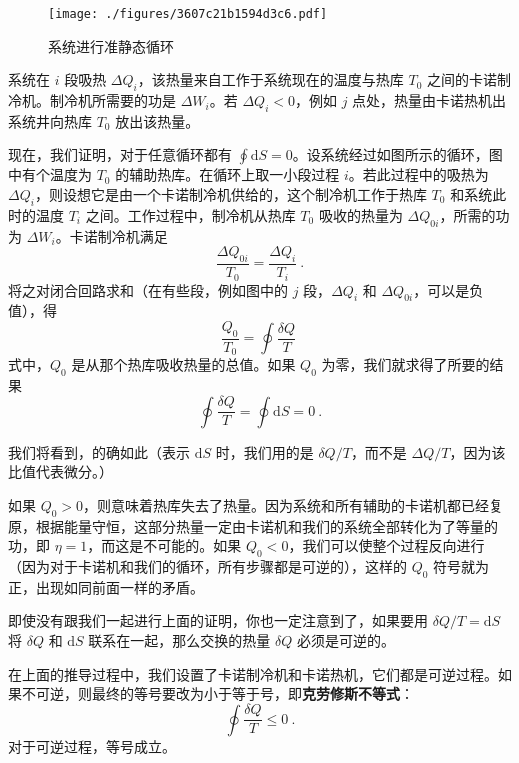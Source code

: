 \begin{figure}[ht]
\centering
\texttt{[image: ./figures/3607c21b1594d3c6.pdf]}
\caption{系统进行准静态循环} \label{fig_Entrop_1}
\end{figure}

系统在 $i$ 段吸热 $\Delta Q_i$，该热量来自工作于系统现在的温度与热库 $T_0$ 之间的卡诺制冷机。制冷机所需要的功是 $\Delta W_i$。若 $\Delta Q_i<0$，例如 $j$ 点处，热量由卡诺热机出系统井向热库 $T_0$ 放出该热量。

现在，我们证明，对于任意循环都有 $\oint \mathrm d S =0 $。设系统经过如图所示的循环，图中有个温度为 $T_0$ 的辅助热库。在循环上取一小段过程 $i$。若此过程中的吸热为 $\Delta Q_i$，则设想它是由一个卡诺制冷机供给的，这个制冷机工作于热库 $T_0$ 和系统此时的温度 $T_i$ 之间。工作过程中，制冷机从热库 $T_0$ 吸收的热量为 $\Delta Q_{0i}$，所需的功为 $\Delta W_i$。卡诺制冷机满足
\begin{equation}
\frac{\Delta Q_{0i}}{T_0}=\frac{\Delta Q_i}{T_i}~.
\end{equation}
将之对闭合回路求和（在有些段，例如图中的 $j$ 段，$\Delta Q_i$ 和 $\Delta Q_{0i}$，可以是负值），得
\begin{equation}
\frac{Q_0}{T_0}=\oint{\frac{\delta Q}{T}}~
\end{equation}
式中，$Q_0$ 是从那个热库吸收热量的总值。如果 $Q_0$ 为零，我们就求得了所要的结果
\begin{equation}
\oint{\frac{\delta Q}{T}=\oint{\text{d}S=0}}~.
\end{equation}

我们将看到，的确如此（表示 $\mathrm dS $ 时，我们用的是 $\delta Q/T$，而不是 $\Delta Q/T$，因为该比值代表微分。）

如果 $Q_0>0$，则意味着热库失去了热量。因为系统和所有辅助的卡诺机都已经复原，根据能量守恒，这部分热量一定由卡诺机和我们的系统全部转化为了等量的功，即 $\eta=1$，而这是不可能的。如果 $Q_0<0$，我们可以使整个过程反向进行（因为对于卡诺机和我们的循环，所有步骤都是可逆的），这样的 $Q_0$ 符号就为正，出现如同前面一样的矛盾。

即使没有跟我们一起进行上面的证明，你也一定注意到了，如果要用 $\delta Q/T=\mathrm d S$ 将 $\delta Q$ 和 $\mathrm dS$ 联系在一起，那么交换的热量 $\delta Q$ 必须是可逆的。

在上面的推导过程中，我们设置了卡诺制冷机和卡诺热机，它们都是可逆过程。如果不可逆，则最终的等号要改为小于等于号，即\textbf{克劳修斯不等式}：
\begin{equation}
\oint \frac{\delta Q}{T}\le 0~.
\end{equation}
对于可逆过程，等号成立。

